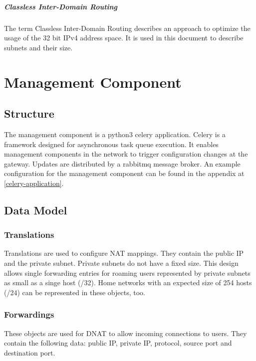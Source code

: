 \documentclass{report}
\begin{document}
\paragraph{Classless Inter-Domain Routing}

The term Classless Inter-Domain Routing describes an approach to optimize
the usage of the 32 bit IPv4 address space. It is used in this document
to describe subnets and their size.

\chapter{Management Component}\label{management-component}

\section{Structure}\label{structure}

The management component is a python3 celery application. Celery is a
framework designed for asynchronous task queue execution\cite{celery}. It
enables management components in the network to trigger
configuration changes at the gateway. Updates are distributed by a rabbitmq message
broker\cite{rabbit}. An example configuration for the management component
can be found in the appendix at \ref{celery-application}.


\section{Data Model}\label{data-model}

\subsection{Translations}\label{translations}

Translations are used to configure NAT mappings. They contain the public
IP and the private subnet. Private subnets do not have a fixed size.
This design allows single forwarding entries for roaming users represented by
private subnets as small as a singe host (/32). Home networks with an expected
size of 254 hosts (/24) can be represented in these objects, too.

\subsection{Forwardings}\label{forwardings}

These objects are used for DNAT to allow incoming connections to users.
They contain the following data: public IP, private IP, protocol, source
port and destination port.
\end{document}
